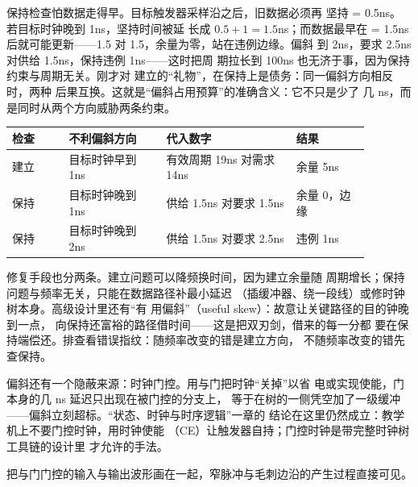 保持检查怕数据走得早。目标触发器采样沿之后，旧数据必须再
坚持  = 0.5ns。若目标时钟晚到 1ns，坚持时间被延
长成 $0.5 + 1 = 1.5$ns；而数据最早在  = 1.5ns
后就可能更新——1.5 对 1.5，余量为零，站在违例边缘。偏斜
到 2ns，要求 2.5ns 对供给 1.5ns，保持违例 1ns——这时把周
期拉长到 100ns 也无济于事，因为保持约束与周期无关。刚才对
建立的“礼物”，在保持上是债务：同一偏斜方向相反时，两种
后果互换。这就是“偏斜占用预算”的准确含义：它不只是少了
几 ns，而是同时从两个方向威胁两条约束。

\begin{longtable}{L{0.14\linewidth}L{0.24\linewidth}L{0.32\linewidth}L{0.18\linewidth}}
\toprule
检查 & 不利偏斜方向 & 代入数字 & 结果 \\
\midrule
建立 & 目标时钟早到 1ns & 有效周期 19ns 对需求 14ns & 余量 5ns \\\tablerowrule
保持 & 目标时钟晚到 1ns & 供给 1.5ns 对要求 1.5ns & 余量 0，边缘 \\\tablerowrule
保持 & 目标时钟晚到 2ns & 供给 1.5ns 对要求 2.5ns & 违例 1ns \\
\bottomrule
\end{longtable}

修复手段也分两条。建立问题可以降频换时间，因为建立余量随
周期增长；保持问题与频率无关，只能在数据路径补最小延迟
（插缓冲器、绕一段线）或修时钟树本身。高级设计里还有“有
用偏斜”（useful skew）：故意让关键路径的目的钟晚到一点，
向保持还富裕的路径借时间——这是把双刃剑，借来的每一分都
要在保持端偿还。排查看错误指纹：随频率改变的错是建立方向，
不随频率改变的错先查保持。

偏斜还有一个隐蔽来源：时钟门控。用与门把时钟“关掉”以省
电或实现使能，门本身的几 ns 延迟只出现在被门控的分支上，
等于在树的一侧凭空加了一级缓冲——偏斜立刻超标。“状态、时钟与时序逻辑”一章的
结论在这里仍然成立：教学机上不要门控时钟，用时钟使能
（CE）让触发器自持；门控时钟是带完整时钟树工具链的设计里
才允许的手法。

把与门门控的输入与输出波形画在一起，窄脉冲与毛刺边沿的产生过程直接可见。

